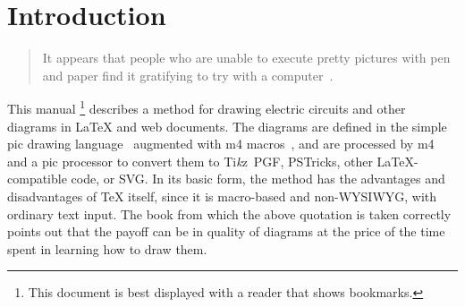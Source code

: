 \newcommand{\bq}{}
\newcommand{\dpic}{{\bq dpic}\xspace}
\newcommand{\Dpic}{{\bq Dpic}\xspace}
\newcommand{\dvips}{{\bq dvips}\xspace}
\newcommand{\gpic}{{\bq gpic}\xspace}
\newcommand{\Gpic}{{\bq Gpic}\xspace}
\newcommand{\groff}{{\bq groff}\xspace}
\newcommand{\latex}{\LaTeX\xspace}
\newcommand{\linespec}{{\sl linespec}\xspace}
\newcommand{\MetaPost}{{\bq MetaPost}\xspace}
\newcommand{\Mfour}{{\bq m4}\xspace}
\newcommand{\mfpic}{{\bq mfpic}\xspace}
\newcommand{\PDF}{{\bq PDF}\xspace}
\newcommand{\pic}{{\bq pic}\xspace}
\newcommand{\Pic}{{\bq Pic}\xspace}
\newcommand{\Postscript}{{\bq Postscript}\xspace}
\newcommand{\PSTricks}{{\bq PSTricks}\xspace}
\newcommand{\SVG}{{\bq SVG}\xspace}
\newcommand{\tex}{\TeX\xspace}
\newcommand{\Textregistered}{\textregistered\xspace}
\newcommand{\TPGF}{{\bq Ti{\it k}z~PGF}\xspace}
\newcommand{\Tikz}{{\bq Ti{\it k}z}\xspace}
\newcommand{\tpic}{{\bq tpic}\xspace}
\newcommand{\xfig}{{\bq xfig}\xspace}
\newcommand{\Xfig}{{\bq Xfig}\xspace}
%
\newcommand{\xection}[1]{\section[\texorpdfstring{#1\ \dotfill}{#1}]{#1}}
\newcommand{\NVL}{\\\hspace*{\parindent}}
\newcommand{\brtt}{\hfill\break\hspace*\parindent}
\newcommand{\lbr}{{\tt\char123}}
\newcommand{\rbr}{{\tt\char125}}
\newcommand{\bsl}{{\tt\char92}}
\newcommand{\SR}[1]{\hyperref[#1]{Section~\ref*{#1}}}
\newcommand{\PR}[1]{\hyperref[#1]{page~\pageref*{#1}}}
\newcommand{\FR}[1]{\hyperref[#1]{Figure~\ref*{#1}}}
\newcommand{\FRS}[1]{\hyperref[#1]{Figures~\ref*{#1}}}
\newcommand{\REF}[1]{\hyperref[#1]{\ref*{#1}}}
\newcommand{\LQ}{\char96}
\newcommand{\RQ}{\char39}
%
\newcommand{\Example}[1]{\vspace{\parsep}\noindent {\bf Example #1:}}
%
%
\xection{Introduction\label{Introduction:}}
   \begin{quotation}\noindent
   It appears that people
   who are unable to execute pretty pictures with pen and paper find it
   gratifying to try with a computer~\cite{Landauer95}.
   \end{quotation}

This manual%
\footnote{This document is best displayed with a reader that shows bookmarks.}
describes a method for drawing electric circuits and
other diagrams in \latex and web documents.
The diagrams are defined in the simple \pic drawing language~\cite{KRpic}
augmented with \Mfour macros~\cite{KRm4}, and are
processed by \Mfour and a \pic processor to
convert them to \TPGF, \PSTricks, other \latex-compatible code, or \SVG.
In its basic form, the method has the advantages and disadvantages of
\tex itself, since it is macro-based and non-WYSIWYG,
with ordinary text input.  The book from which the above quotation
is taken correctly points out that the payoff can be in quality of
diagrams at the price of the time spent in learning how to draw them.

